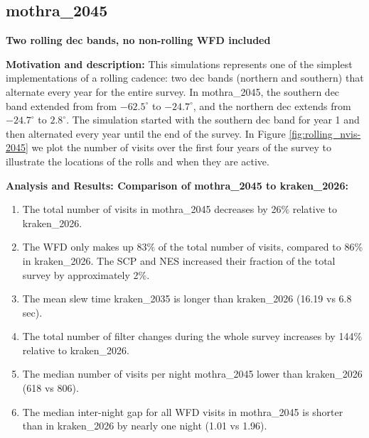 \documentclass[DM,authoryear,toc]{lsstdoc}
\begin{document}
\subsection{mothra\_2045} \label{mothra2045}

\textbf{Two rolling dec bands, no non-rolling WFD included}

\textbf{Motivation and description:} This simulations represents one of the simplest implementations of a rolling cadence:
two dec bands (northern and southern) that alternate every year for the entire survey. In mothra\_2045, the southern dec band extended from
from $-62.5^{\circ}$ to $-24.7^{\circ}$, and the northern dec extends from $-24.7^{\circ}$ to $2.8^{\circ}$. The simulation started with
the southern dec band for year 1 and then alternated every year until the end of the survey. In Figure \autoref{fig:rolling_nvis-2045}
we plot the number of visits over the first four years of the survey to illustrate the locations of the rolls and when they are active.

\textbf{Analysis and Results: Comparison of mothra\_2045 to kraken\_2026:}

\begin{enumerate}
\item The total number of visits in mothra\_2045 decreases by 26$\%$ relative to kraken\_2026.
\item The WFD only makes up 83$\%$ of the total number of visits, compared to 86$\%$ in kraken\_2026.
The SCP and NES increased their fraction of the total survey by approximately 2$\%$.
\item The mean slew time kraken\_2035 is longer than kraken\_2026 (16.19 vs 6.8 sec).
\item The total number of filter changes during the whole survey increases by 144$\%$ relative to kraken\_2026.
\item The median number of visits per night mothra\_2045 lower than kraken\_2026 (618 vs 806).
\item The median inter-night gap for all WFD visits in mothra\_2045 is shorter than in kraken\_2026 by nearly one night (1.01 vs 1.96).
\end{enumerate}
\end{document}
